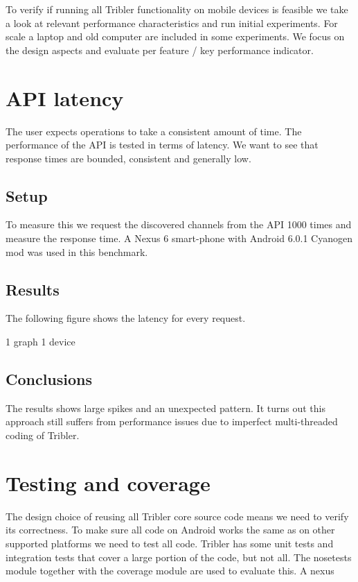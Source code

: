 
To verify if running all Tribler functionality on mobile devices is feasible we take a look at relevant performance characteristics and run initial experiments.
For scale a laptop and old computer are included in some experiments.
We focus on the design aspects and evaluate per feature / key performance indicator.




\section{API latency}
The user expects operations to take a consistent amount of time.
The performance of the API is tested in terms of latency.
We want to see that response times are bounded, consistent and generally low.

\subsection{Setup}
To measure this we request the discovered channels from the API 1000 times and measure the response time.
A Nexus 6 smart-phone with Android 6.0.1 Cyanogen mod was used in this benchmark.

\subsection{Results}
The following figure shows the latency for every request.

1 graph
1 device

\subsection{Conclusions}
The results shows large spikes and an unexpected pattern.
It turns out this approach still suffers from performance issues due to imperfect multi-threaded coding of Tribler.


\section{Testing and coverage}
The design choice of reusing all Tribler core source code means we need to verify its correctness.
To make sure all code on Android works the same as on other supported platforms we need to test all code.
Tribler has some unit tests and integration tests that cover a large portion of the code, but not all.
The nosetests module together with the coverage module are used to evaluate this.
A nexus 

